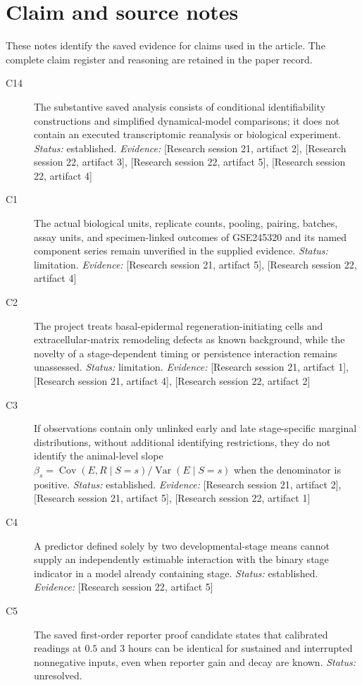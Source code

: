 \documentclass[11pt]{article}
\begin{document}
\section{Claim and source notes}
These notes identify the saved evidence for claims used in the article. The complete claim register and reasoning are retained in the paper record.
\begin{sloppypar}
\small
\begin{description}
\item[C14] The substantive saved analysis consists of conditional identifiability constructions and simplified dynamical-model comparisons; it does not contain an executed transcriptomic reanalysis or biological experiment. \textit{Status: }established.
\textit{Evidence: }[Research session 21, artifact 2], [Research session 22, artifact 3], [Research session 22, artifact 5], [Research session 22, artifact 4]
\item[C1] The actual biological units, replicate counts, pooling, pairing, batches, assay units, and specimen-linked outcomes of GSE245320 and its named component series remain unverified in the supplied evidence. \textit{Status: }limitation.
\textit{Evidence: }[Research session 21, artifact 5], [Research session 22, artifact 4]
\item[C2] The project treats basal-epidermal regeneration-initiating cells and extracellular-matrix remodeling defects as known background, while the novelty of a stage-dependent timing or persistence interaction remains unassessed. \textit{Status: }limitation.
\textit{Evidence: }[Research session 21, artifact 1], [Research session 21, artifact 4], [Research session 22, artifact 2]
\item[C3] If observations contain only unlinked early and late stage-specific marginal distributions, without additional identifying restrictions, they do not identify the animal-level slope $\beta_s=\operatorname{Cov}(E,R\mid S=s)/\operatorname{Var}(E\mid S=s)$ when the denominator is positive. \textit{Status: }established.
\textit{Evidence: }[Research session 21, artifact 2], [Research session 21, artifact 5], [Research session 22, artifact 1]
\item[C4] A predictor defined solely by two developmental-stage means cannot supply an independently estimable interaction with the binary stage indicator in a model already containing stage. \textit{Status: }established.
\textit{Evidence: }[Research session 22, artifact 5]
\item[C5] The saved first-order reporter proof candidate states that calibrated readings at $0.5$ and $3$ hours can be identical for sustained and interrupted nonnegative inputs, even when reporter gain and decay are known. \textit{Status: }unresolved.

\end{description}
\end{sloppypar}
\end{document}
